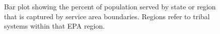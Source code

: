 \documentclass[
  letterpaper,
  DIV=11,
  numbers=noendperiod,
  oneside]{scrartcl}
\begin{document}
\begin{figure}


\caption{\label{fig-statePopServed}Bar plot showing the percent of
population served by state or region that is captured by service area
boundaries. Regions refer to tribal systems within that EPA region.}

\end{figure}%
\end{document}
